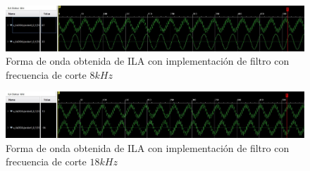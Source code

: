 \documentclass{article}
\begin{document}
\begin{figure}[ht]
    \centering
    \includegraphics[width=\textwidth]{impl-cutoff_8khz.jpg}
    \caption{Forma de onda obtenida de ILA con implementación de filtro con frecuencia de corte $8 kHz$}
    \label{fig:filter8}
\end{figure}

\begin{figure}[ht]
    \centering
    \includegraphics[width=\textwidth]{impl-cutoff_18khz.jpg}
    \caption{Forma de onda obtenida de ILA con implementación de filtro con frecuencia de corte $18 kHz$}
    \label{fig:filter18}
\end{figure}
\end{document}
